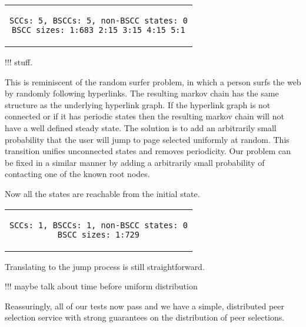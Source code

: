 \documentclass[a4paper,10pt]{article}
\newcommand{\prismmodel}[1]{
  \begin{quotation}
  \footnotesize
  
  \end{quotation}
}
\newenvironment{prismprop}[0]{
  \begin{center}
  \begin{tabular}{c}
  \footnotesize
}{
  \end{tabular}
  \end{center}
}
\begin{document}
\begin{prismprop}
\begin{lstlisting}
SCCs: 5, BSCCs: 5, non-BSCC states: 0
BSCC sizes: 1:683 2:15 3:15 4:15 5:1
\end{lstlisting}
\end{prismprop}

!!! stuff. 

This is reminiscent of the random surfer problem, in which a person surfs the web by randomly following hyperlinks. The resulting markov chain has the same structure as the underlying hyperlink graph. If the hyperlink graph is not connected or if it has periodic states then the resulting markov chain will not have a well defined steady state. The solution is to add an arbitrarily small probability that the user will jump to page selected uniformly at random. This transition unifies unconnected states and removes periodicity. Our problem can be fixed in a similar manner by adding a arbitrarily small probability of contacting one of the known root nodes.

\prismmodel{ctmc_full}

Now all the states are reachable from the initial state.

\begin{prismprop}
\begin{lstlisting}
SCCs: 1, BSCCs: 1, non-BSCC states: 0
BSCC sizes: 1:729
\end{lstlisting}
\end{prismprop}

Translating to the jump process is still straightforward.

\prismmodel{dtmc_full}

!!! maybe talk about time before uniform distribution

Reassuringly, all of our tests now pass and we have a simple, distributed peer selection service with strong guarantees on the distribution of peer selections. 
\end{document}
